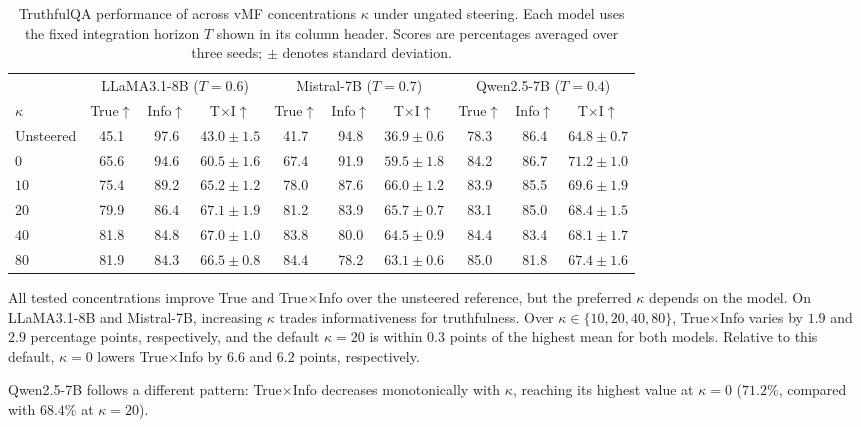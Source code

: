 \begin{table}[ht]
\centering
\small
\setlength{\tabcolsep}{3.5pt}
\caption{TruthfulQA performance of \Cobras across vMF concentrations $\kappa$ under ungated steering. Each model uses the fixed integration horizon $T$ shown in its column header. Scores are percentages averaged over three seeds; $\pm$ denotes standard deviation.}
\label{tab:cobras_vs_kappa}
\begin{tabular}{lccccccccc}
\toprule
& \multicolumn{3}{c}{LLaMA3.1-8B ($T=0.6$)} & \multicolumn{3}{c}{Mistral-7B ($T=0.7$)} & \multicolumn{3}{c}{Qwen2.5-7B ($T=0.4$)} \\
\cmidrule(lr){2-4}\cmidrule(lr){5-7}\cmidrule(lr){8-10}
$\kappa$ & True$\uparrow$ & Info$\uparrow$ & T$\times$I$\uparrow$ & True$\uparrow$ & Info$\uparrow$ & T$\times$I$\uparrow$ & True$\uparrow$ & Info$\uparrow$ & T$\times$I$\uparrow$ \\
\midrule
Unsteered & 45.1 & 97.6 & $43.0\pm1.5$ & 41.7 & 94.8 & $36.9\pm0.6$ & 78.3 & 86.4 & $64.8\pm0.7$ \\
\midrule
$0$ & 65.6 & 94.6 & $60.5\pm1.6$ & 67.4 & 91.9 & $59.5\pm1.8$ & 84.2 & 86.7 & $71.2\pm1.0$ \\
$10$ & 75.4 & 89.2 & $65.2\pm1.2$ & 78.0 & 87.6 & $66.0\pm1.2$ & 83.9 & 85.5 & $69.6\pm1.9$ \\
$20$ & 79.9 & 86.4 & $67.1\pm1.9$ & 81.2 & 83.9 & $65.7\pm0.7$ & 83.1 & 85.0 & $68.4\pm1.5$ \\
$40$ & 81.8 & 84.8 & $67.0\pm1.0$ & 83.8 & 80.0 & $64.5\pm0.9$ & 84.4 & 83.4 & $68.1\pm1.7$ \\
$80$ & 81.9 & 84.3 & $66.5\pm0.8$ & 84.4 & 78.2 & $63.1\pm0.6$ & 85.0 & 81.8 & $67.4\pm1.6$ \\
\bottomrule
\end{tabular}
\end{table}


All tested concentrations improve True and True$\times$Info over the unsteered reference, but the preferred $\kappa$ depends on the model. On LLaMA3.1-8B and Mistral-7B, increasing $\kappa$ trades informativeness for truthfulness. Over $\kappa\in\{10,20,40,80\}$, True$\times$Info varies by $1.9$ and $2.9$ percentage points, respectively, and the default $\kappa=20$ is within $0.3$ points of the highest mean for both models. Relative to this default, $\kappa=0$ lowers True$\times$Info by $6.6$ and $6.2$ points, respectively.

Qwen2.5-7B follows a different pattern: True$\times$Info decreases monotonically with $\kappa$, reaching its highest value at $\kappa=0$ ($71.2\%$, compared with $68.4\%$ at $\kappa=20$).

